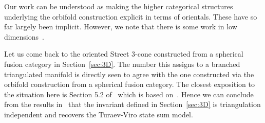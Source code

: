 Our work can be understood as making the higher categorical structures underlying the orbifold construction explicit in terms of orientals.
These have so far largely been implicit.
However, we note that there is some work in low dimensions~\cite{carqueville2016orbifoldcompletion,3DOrb}.

Let us come back to the oriented Street 3-cone constructed from a spherical fusion category in Section~\ref{sec:3D}.
The number this assigns to a branched triangulated manifold is directly seen to agree with the one constructed via the orbifold construction from a spherical fusion category. The closest exposition to the situation here is Section 5.2 of~\cite{3DOrb} which is based on~\cite{Carqueville:2018sld}. Hence we can conclude from the results in~\cite{Carqueville:2018sld} that the invariant defined in Section~\ref{sec:3D} is triangulation independent and recovers the Turaev-Viro state sum model.


